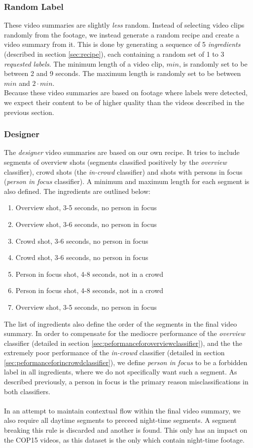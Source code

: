 \subsubsection{Random Label}
%
These video summaries are slightly \textit{less} random. Instead of selecting video clips randomly from the footage, we instead generate a random recipe and create a video summary from it. This is done by generating a sequence of 5 \textit{ingredients} (described in section \ref{sec:recipe}), each containing a random set of 1 to 3 \textit{requested labels}. The minimum length of a video clip, $min$, is randomly set to be between 2 and 9 seconds. The maximum length is randomly set to be between $min$ and $2 \cdot min$.\\
Because these video summaries are based on footage where labels were detected, we expect their content to be of higher quality than the videos described in the previous section.
%
\subsubsection{Designer}\label{sec:phase4designer}
%
The \textit{designer} video summaries are based on our own recipe. It tries to include segments of overview shots (segments classified positively by the \textit{overview} classifier), crowd shots (the \textit{in-crowd} classifier) and shots with persons in focus (\textit{person in focus} classifier). A minimum and maximum length for each segment is also defined. The ingredients are outlined below:
%
\begin{enumerate}
\item Overview shot, 3-5 seconds, no person in focus
\item Overview shot, 3-6 seconds, no person in focus
\item Crowd shot, 3-6 seconds, no person in focus
\item Crowd shot, 3-6 seconds, no person in focus
\item Person in focus shot, 4-8 seconds, not in a crowd
\item Person in focus shot, 4-8 seconds, not in a crowd
\item Overview shot, 3-5 seconds, no person in focus
\end{enumerate}
%
The list of ingredients also define the order of the segments in the final video summary. In order to compensate for the mediocre performance of the \textit{overview} classifier (detailed in section \ref{sec:peformanceforoverviewclassifier}), and the the extremely poor performance of the \textit{in-crowd} classifier (detailed in section \ref{sec:peformanceforincrowdclassifier}), we define \textit{person in focus} to be a forbidden label in all ingredients, where we do not specifically want such a segment. As described previously, a person in focus is the primary reason misclassifications in both classifiers.\\
\\
In an attempt to maintain contextual flow within the final video summary, we also require all daytime segments to preceed night-time segments. A segment breaking this rule is discarded and another is found. This only has an impact on the COP15 videos, as this dataset is the only which contain night-time footage.
%
